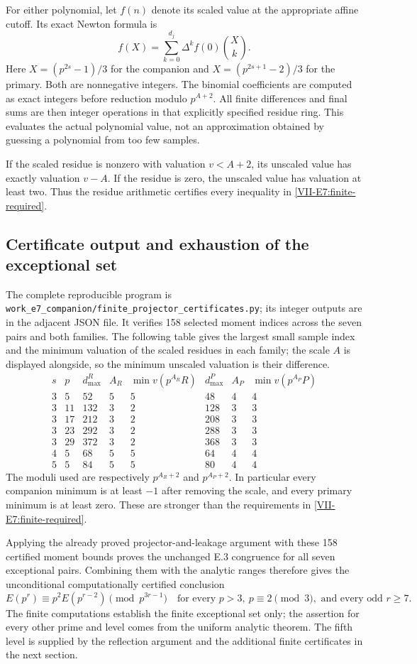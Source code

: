 \documentclass[11pt,letterpaper]{article}
\numberwithin{equation}{section}
\begin{document}
For either polynomial, let $f(n)$ denote its scaled value at the
appropriate affine cutoff. Its exact Newton formula is
\[
 f(X)=\sum_{k=0}^{d_j}\Delta^kf(0)\binom Xk.
\]
Here $X=(p^{2s}-1)/3$ for the companion and
$X=(p^{2s+1}-2)/3$ for the primary. Both are nonnegative integers.
The binomial coefficients are computed as exact integers before
reduction modulo $p^{A+2}$. All finite differences and final sums are
then integer operations in that explicitly specified residue ring.
This evaluates the actual polynomial value, not an approximation
obtained by guessing a polynomial from too few samples.

If the scaled residue is nonzero with valuation $v<A+2$, its unscaled
value has exactly valuation $v-A$. If the residue is zero, the
unscaled value has valuation at least two. Thus the residue arithmetic
certifies every inequality in \eqref{VII-E7:finite-required}.

\subsection{Certificate output and exhaustion of the exceptional set}
The complete reproducible program is
\nolinkurl{work_e7_companion/finite_projector_certificates.py}; its
integer outputs are in the adjacent JSON file. It verifies 158 selected
moment indices across the seven pairs and both families. The following
table gives the largest small sample index and the minimum valuation
of the scaled residues in each family; the scale $A$ is displayed
alongside, so the minimum unscaled valuation is their difference.
\[
\begin{array}{c|c|r|c|r|r|c|r}
s&p&d_{\max}^R&A_R&\min v(p^{A_R}R)&d_{\max}^P&A_P&\min v(p^{A_P}P)\\\hline
3&5 &52 &5&5&48 &4&4\\
3&11&132&3&2&128&3&3\\
3&17&212&3&2&208&3&3\\
3&23&292&3&2&288&3&3\\
3&29&372&3&2&368&3&3\\
4&5 &68 &5&5&64 &4&4\\
5&5 &84 &5&5&80 &4&4
\end{array}
\]
The moduli used are respectively $p^{A_R+2}$ and $p^{A_P+2}$.
In particular every companion minimum is at least $-1$ after removing
the scale, and every primary minimum is at least zero. These are
stronger than the requirements in \eqref{VII-E7:finite-required}.

Applying the already proved projector-and-leakage argument with these
158 certified moment bounds proves the unchanged E.3 congruence for
all seven exceptional pairs. Combining them with the analytic ranges
therefore gives the unconditional computationally certified conclusion
\[
 \boxed{E(p^r)\equiv p^2E(p^{r-2})\pmod{p^{3r-1}}
 \quad\text{for every }p>3,\ p\equiv2\pmod3,
 \text{ and every odd }r\ge7.}
\]
The finite computations establish the finite exceptional set only;
the assertion for every other prime and level comes from the uniform
analytic theorem. The fifth level is supplied by the reflection argument and the
additional finite certificates in the next section.
\end{document}
